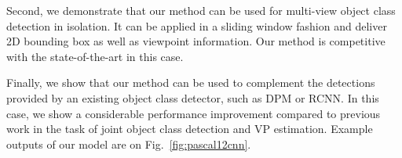 \documentclass[extendedabs]{bmvc2k}
\begin{document}
Second, we demonstrate that our method can be used for multi-view
object class detection in isolation. It can be applied in a sliding
window fashion and deliver 2D bounding box as well as viewpoint
information. Our method is competitive with the state-of-the-art in this
case.

Finally, we show that our method can be used to complement the
detections provided by an existing object class detector, such
as DPM or RCNN. In this case, we show a considerable performance improvement
compared to previous work in the task of joint object class detection and VP
estimation. Example outputs of our model are on Fig.~\ref{fig:pascal12cnn}.


\end{document}
